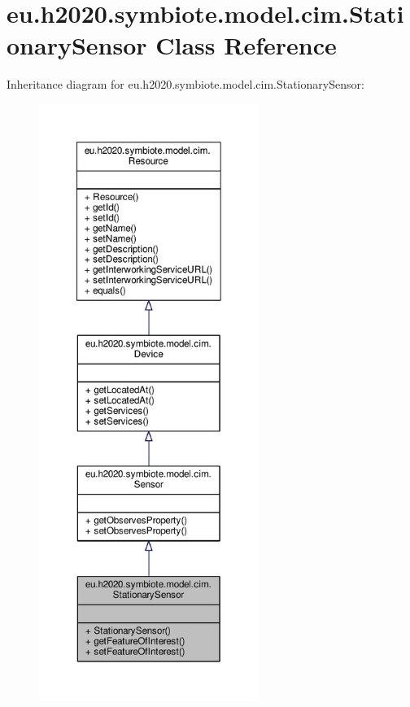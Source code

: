 \hypertarget{classeu_1_1h2020_1_1symbiote_1_1model_1_1cim_1_1StationarySensor}{}\section{eu.\+h2020.\+symbiote.\+model.\+cim.\+Stationary\+Sensor Class Reference}
\label{classeu_1_1h2020_1_1symbiote_1_1model_1_1cim_1_1StationarySensor}


Inheritance diagram for eu.\+h2020.\+symbiote.\+model.\+cim.\+Stationary\+Sensor\+:\nopagebreak
\begin{figure}[H]
\begin{center}
\leavevmode
\includegraphics[height=550pt]{classeu_1_1h2020_1_1symbiote_1_1model_1_1cim_1_1StationarySensor__inherit__graph}
\end{center}
\end{figure}


